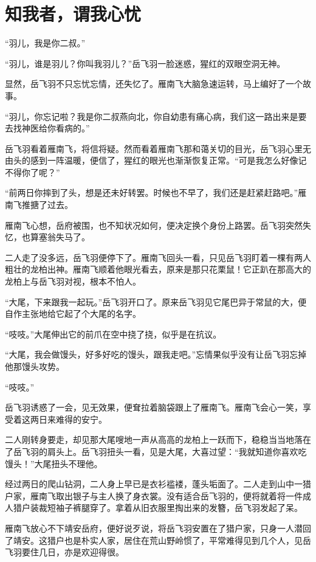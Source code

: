 \chapter{知我者，谓我心忧}
\label{chap:zhi-wo-zhe-wei-wo-xin-you}

“羽儿，我是你二叔。”

“羽儿，谁是羽儿？你叫我羽儿？”岳飞羽一脸迷惑，猩红的双眼空洞无神。

显然，岳飞羽不只忘忧忘情，还失忆了。雁南飞大脑急速运转，马上编好了一个故事。

“羽儿，你忘记啦？我是你二叔燕向北，你自幼患有痛心病，我们这一路出来是要去找神医给你看病的。”

岳飞羽看着雁南飞，将信将疑。然而看着雁南飞那和蔼关切的目光，岳飞羽心里无由头的感到一阵温暖，便信了，猩红的眼光也渐渐恢复正常。“可是我怎么好像记不得你了呢？”

“前两日你摔到了头，想是还未好转罢。时候也不早了，我们还是赶紧赶路吧。”雁南飞推搪了过去。

雁南飞心想，岳府被围，也不知状况如何，便决定换个身份上路罢。岳飞羽突然失忆，也算塞翁失马了。

二人走了没多远，岳飞羽便停下了。雁南飞回头一看，只见岳飞羽盯着一棵有两人粗壮的龙柏出神。雁南飞顺着他眼光看去，原来是那只花栗鼠！它正趴在那高大的龙柏上与岳飞羽对视，根本不怕人。

“大尾，下来跟我一起玩。”岳飞羽开口了。原来岳飞羽见它尾巴异于常鼠的大，便自作主张地给它起了个大尾的名字。

“吱吱。”大尾伸出它的前爪在空中挠了挠，似乎是在抗议。

“大尾，我会做馒头，好多好吃的馒头，跟我走吧。”忘情果似乎没有让岳飞羽忘掉他那馒头攻势。

“吱吱。”

岳飞羽诱惑了一会，见无效果，便耷拉着脑袋跟上了雁南飞。雁南飞会心一笑，享受着这两日来难得的安宁。

二人刚转身要走，却见那大尾嗖地一声从高高的龙柏上一跃而下，稳稳当当地落在了岳飞羽的肩头上。岳飞羽扭头一看，见是大尾，大喜过望：“我就知道你喜欢吃馒头！”大尾扭头不理他。

经过两日的爬山钻洞，二人身上早已是衣衫褴褛，蓬头垢面了。二人走到山中一猎户家，雁南飞取出银子与主人换了身衣裳。没有适合岳飞羽的，便将就着将一件成人猎户装裁短袖子裤腿穿了。拿着从旧衣服里掏出来的发簪，岳飞羽发起了呆。

雁南飞放心不下靖安岳府，便好说歹说，将岳飞羽安置在了猎户家，只身一人潜回了靖安。这猎户也是朴实人家，居住在荒山野岭惯了，平常难得见到几个人，见岳飞羽要住几日，亦是欢迎得很。

